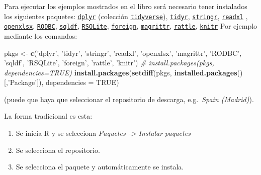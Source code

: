 \documentclass[
]{book}
\newenvironment{Shaded}{\begin{snugshade}}{\end{snugshade}}
\newcommand{\CommentTok}[1]{\textcolor[rgb]{0.56,0.35,0.01}{\textit{#1}}}
\newcommand{\DataTypeTok}[1]{\textcolor[rgb]{0.13,0.29,0.53}{#1}}
\newcommand{\KeywordTok}[1]{\textcolor[rgb]{0.13,0.29,0.53}{\textbf{#1}}}
\newcommand{\NormalTok}[1]{#1}
\newcommand{\OtherTok}[1]{\textcolor[rgb]{0.56,0.35,0.01}{#1}}
\newcommand{\StringTok}[1]{\textcolor[rgb]{0.31,0.60,0.02}{#1}}
\begin{document}
Para ejecutar los ejemplos mostrados en el libro será necesario tener instalados los siguientes paquetes:
\href{https://dplyr.tidyverse.org}{\texttt{dplyr}} (colección \href{https://www.tidyverse.org/}{\texttt{tidyverse}}),
\href{https://tidyr.tidyverse.org}{\texttt{tidyr}},
\href{https://stringr.tidyverse.org}{\texttt{stringr}},
\href{https://readxl.tidyverse.org}{\texttt{readxl}} ,
\href{https://cran.r-project.org/web/packages/openxlsx/index.html}{\texttt{openxlsx}}, \href{https://cran.r-project.org/web/packages/RODBC/index.html}{\texttt{RODBC}},
\href{https://cran.r-project.org/web/packages/sqldf/index.html}{\texttt{sqldf}},
\href{https://r-dbi.github.io/RSQLite}{\texttt{RSQLite}},
\href{https://cran.r-project.org/web/packages/foreign/index.html}{\texttt{foreign}},
\href{https://cran.r-project.org/web/packages/magrittr/index.html}{\texttt{magrittr}},
\href{https://rattle.togaware.com}{\texttt{rattle}},
\href{https://yihui.name/knitr}{\texttt{knitr}}
Por ejemplo mediante los comandos:

\begin{Shaded}
\begin{Highlighting}[]
\NormalTok{pkgs <-}\StringTok{ }\KeywordTok{c}\NormalTok{(}\StringTok{'dplyr'}\NormalTok{, }\StringTok{'tidyr'}\NormalTok{, }\StringTok{'stringr'}\NormalTok{, }\StringTok{'readxl'}\NormalTok{, }\StringTok{'openxlsx'}\NormalTok{, }\StringTok{'magrittr'}\NormalTok{, }
          \StringTok{'RODBC'}\NormalTok{, }\StringTok{'sqldf'}\NormalTok{, }\StringTok{'RSQLite'}\NormalTok{, }\StringTok{'foreign'}\NormalTok{, }\StringTok{'rattle'}\NormalTok{, }\StringTok{'knitr'}\NormalTok{)}
\CommentTok{# install.packages(pkgs, dependencies=TRUE)}
\KeywordTok{install.packages}\NormalTok{(}\KeywordTok{setdiff}\NormalTok{(pkgs, }\KeywordTok{installed.packages}\NormalTok{()[,}\StringTok{'Package'}\NormalTok{]), }\DataTypeTok{dependencies =} \OtherTok{TRUE}\NormalTok{)}
\end{Highlighting}
\end{Shaded}

(puede que haya que seleccionar el repositorio de descarga, e.g.~\emph{Spain (Madrid)}).

La forma tradicional es esta:

\begin{enumerate}
\def\labelenumi{\arabic{enumi}.}
\item
  Se inicia R y se selecciona \emph{Paquetes -\textgreater{} Instalar paquetes}
\item
  Se selecciona el repositorio.
\item
  Se selecciona el paquete y automáticamente se instala.
\end{enumerate}
\end{document}
